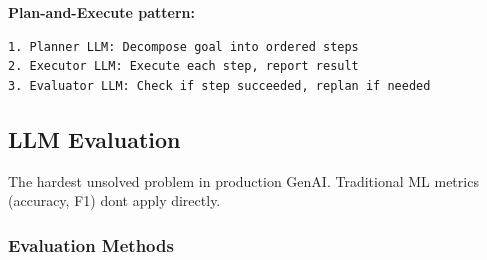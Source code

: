 \documentclass[11pt]{article}
\begin{document}
\textbf{Plan-and-Execute pattern:}

\setcodelang{}

\begin{verbatim}
1. Planner LLM: Decompose goal into ordered steps
2. Executor LLM: Execute each step, report result
3. Evaluator LLM: Check if step succeeded, replan if needed
\end{verbatim}

\subsection{LLM Evaluation}\label{llm-evaluation}

The hardest unsolved problem in production GenAI. Traditional ML metrics (accuracy, F1) don\textquotesingle t apply directly.

\subsubsection{Evaluation Methods}\label{evaluation-methods}
\end{document}
